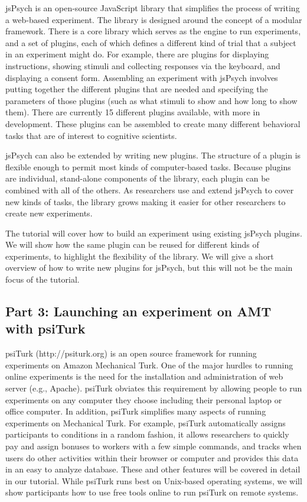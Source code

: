 \documentclass[10pt,letterpaper]{article}
\begin{document}
jsPsych is an open-source JavaScript library that simplifies the process of writing a web-based experiment. The library is designed around the concept of a modular framework. There is a core library which serves as the engine to run experiments, and a set of plugins, each of which defines a different kind of trial that a subject in an experiment might do. For example, there are plugins for displaying instructions, showing stimuli and collecting responses via the keyboard, and displaying a consent form. Assembling an experiment with jsPsych involves putting together the different plugins that are needed and specifying the parameters of those plugins (such as what stimuli to show and how long to show them). There are currently 15 different plugins available, with more in development. These plugins can be assembled to create many different behavioral tasks that are of interest to cognitive scientists.

jsPsych can also be extended by writing new plugins. The structure of a plugin is flexible enough to permit most kinds of computer-based tasks. Because plugins are individual, stand-alone components of the library, each plugin can be combined with all of the others. As researchers use and extend jsPsych to cover new kinds of tasks, the library grows making it easier for other researchers to create new experiments.

The tutorial will cover how to build an experiment using existing jsPsych plugins. We will show how the same plugin can be reused for different kinds of experiments, to highlight the flexibility of the library. We will give a short overview of how to write new plugins for jsPsych, but this will not be the main focus of the tutorial.

\subsection{Part 3: Launching an experiment on AMT with psiTurk}

psiTurk (http://psiturk.org) is an open source framework for running experiments on Amazon Mechanical Turk.  One of the major hurdles to running online experiments
is the need for the installation and administration of web server (e.g., Apache).  psiTurk obviates this requirement by allowing people to run experiments
on any computer they choose including their personal laptop or office computer.  In addition, psiTurk simplifies many aspects of running experiments
on Mechanical Turk.  For example, psiTurk automatically assigns participants to conditions in a random fashion, it allows researchers to quickly
pay and assign bonuses to workers with a few simple commands, and tracks when users do other activities within their browser or computer
and provides this data in an easy to analyze database.  These and other features will be covered in detail in our tutorial.  While psiTurk runs best
on Unix-based operating systems, we will show participants how to use free tools online to run psiTurk on remote systems.
\end{document}
